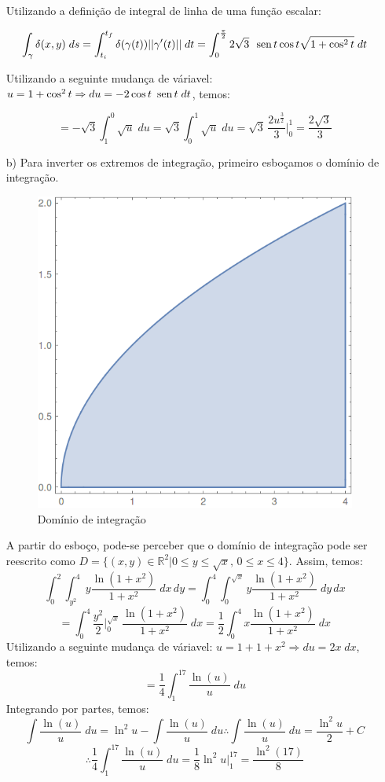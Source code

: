 \documentclass[12pt,a4paper]{article}
\newcommand{\sen}{\mbox{\, sen}\,}
\begin{document}
\begin{itemize}
Utilizando a definição de integral de linha de uma função escalar:

$$  \int_{\gamma}{\delta(x,y)}\;ds = \int_{t_i}^{t_f} {\delta(\gamma(t)) ||\gamma'(t) ||}\;dt = \int_{0}^{\frac{\pi}{2}} 2 \sqrt{3} \, \sen t \cos t \sqrt{1 + \cos^2 t} \;dt $$

Utilizando a seguinte mudança de váriavel: $u = 1 + \cos^2 t \Rightarrow du = -2\cos t \sen t \; dt $, temos:

$$ = -\sqrt{3} \int_1^0 \sqrt{u} \; du =  \sqrt{3} \int_0^1 \sqrt{u} \; du = \sqrt{3} \, \frac{2u^{\frac{3}{2}}}{3} \Big|_0^1 = \frac{2\sqrt{3}}{3} $$

\item[b)] Para inverter os extremos de integração, primeiro esboçamos o domínio de integração.
\begin{figure}[H]
	\centering
	\includegraphics[scale=0.25]{Fig2b.png}  
	\caption{Domínio de integração}
	\label{fig:figura2b}
\end{figure}
A partir do esboço, pode-se perceber que o domínio de integração pode ser reescrito como $D= \{(x,y)\in \mathbb{R}^2 | 0 \leq y \leq \sqrt{x}, \, 0 \leq x \leq 4\}$. Assim, temos:
$$ \int_0^2 \int_{y^2}^4 y \frac{\ln (1+x^2)}{1+x^2} \; dx \, dy = \int_0^4 \int_0^{\sqrt{x}} y \frac{\ln (1+x^2)}{1+x^2} \; dy \, dx  $$
$$ = \int_0^4  \frac{y^2}{2} \Big|_0^{\sqrt{x}} \, \frac{\ln (1+x^2)}{1+x^2} \; dx = \frac{1}{2} \int_0^4 x \frac{\ln (1+x^2)}{1+x^2} \; dx $$
Utilizando a seguinte mudança de váriavel: $u = 1 + 1+x^2 \Rightarrow du = 2 x \; dx $, temos:
$$ =  \frac{1}{4} \int_1^{17} \frac{\ln (u)}{u} \; du $$
Integrando por partes, temos:
$$ \int \frac{\ln (u)}{u} \; du = \ln^2 u - \int \frac{\ln (u)}{u} \; du \therefore \int \frac{\ln (u)}{u} \; du = \frac{\ln^2 u}{2} + C $$
$$ \therefore \frac{1}{4} \int_1^{17} \frac{\ln (u)}{u} \; du = \frac{1}{8} \ln^2 u \Big|_1^{17} = \frac{\ln^2(17)}{8} $$

\end{itemize}
\end{document}
